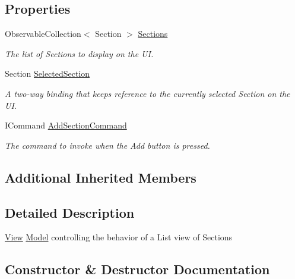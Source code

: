\subsection*{Properties}
\begin{DoxyCompactItemize}
\item 
Observable\+Collection$<$ Section $>$ \hyperlink{class_listen_to_me_1_1_view_model_1_1_section_list_view_model_adf81e04a9788a1c5372d0cf517282fea}{Sections}
\begin{DoxyCompactList}\small\item\em The list of Sections to display on the UI. \end{DoxyCompactList}\item 
Section \hyperlink{class_listen_to_me_1_1_view_model_1_1_section_list_view_model_a75f26037abfa359ad884df4fd17a9409}{Selected\+Section}
\begin{DoxyCompactList}\small\item\em A two-\/way binding that keeps reference to the currently selected Section on the UI. \end{DoxyCompactList}\item 
I\+Command \hyperlink{class_listen_to_me_1_1_view_model_1_1_section_list_view_model_ac121b81d27f1365be1c8d8a00d65f7f0}{Add\+Section\+Command}
\begin{DoxyCompactList}\small\item\em The command to invoke when the Add button is pressed. \end{DoxyCompactList}\end{DoxyCompactItemize}
\subsection*{Additional Inherited Members}


\subsection{Detailed Description}
\hyperlink{namespace_listen_to_me_1_1_view}{View} \hyperlink{namespace_listen_to_me_1_1_model}{Model} controlling the behavior of a List view of Sections 



\subsection{Constructor \& Destructor Documentation}
